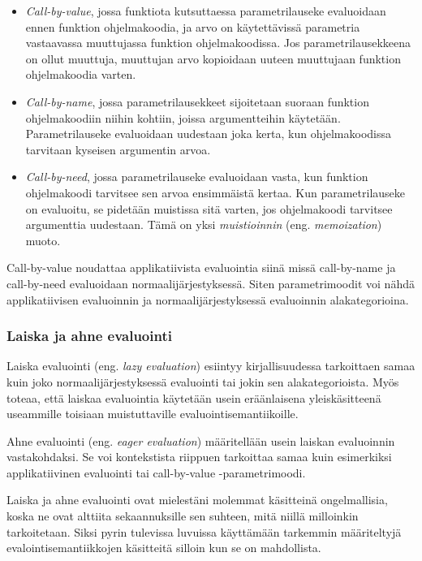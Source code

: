 \begin{itemize}
	\item \textit{Call-by-value}, jossa funktiota kutsuttaessa parametrilauseke evaluoidaan ennen funktion ohjelmakoodia, ja arvo on käytettävissä parametria vastaavassa muuttujassa funktion ohjelmakoodissa. Jos parametrilausekkeena on ollut muuttuja, muuttujan arvo kopioidaan uuteen muuttujaan funktion ohjelmakoodia varten. \citep{scott2009programming}
    \item \textit{Call-by-name}, jossa parametrilausekkeet sijoitetaan suoraan funktion ohjelmakoodiin niihin kohtiin, joissa argumentteihin käytetään. Parametrilauseke evaluoidaan uudestaan joka kerta, kun ohjelmakoodissa tarvitaan kyseisen argumentin arvoa. \citep{ariola1995callbyneed}
    \item \textit{Call-by-need}, jossa parametrilauseke evaluoidaan vasta, kun funktion ohjelmakoodi tarvitsee sen arvoa ensimmäistä kertaa. Kun parametrilauseke on evaluoitu, se pidetään muistissa sitä varten, jos ohjelmakoodi tarvitsee argumenttia uudestaan. Tämä on yksi \textit{muistioinnin} (eng. \textit{memoization}) muoto. \citep{ariola1995callbyneed}
\end{itemize}

Call-by-value noudattaa applikatiivista evaluointia siinä missä call-by-name ja call-by-need evaluoidaan normaalijärjestyksessä. Siten parametrimoodit voi nähdä applikatiivisen evaluoinnin ja normaalijärjestyksessä evaluoinnin alakategorioina.

\subsubsection{Laiska ja ahne evaluointi}

Laiska evaluointi (eng. \textit{lazy evaluation}) esiintyy kirjallisuudessa tarkoittaen samaa kuin joko normaalijärjestyksessä evaluointi tai jokin sen alakategorioista. Myös \citet{scott2009programming} toteaa, että laiskaa evaluointia käytetään usein eräänlaisena yleiskäsitteenä useammille toisiaan muistuttaville evaluointisemantiikoille.

Ahne evaluointi (eng. \textit{eager evaluation}) määritellään usein laiskan evaluoinnin vastakohdaksi. Se voi kontekstista riippuen tarkoittaa samaa kuin esimerkiksi applikatiivinen evaluointi tai call-by-value -parametrimoodi.

Laiska ja ahne evaluointi ovat mielestäni molemmat käsitteinä ongelmallisia, koska ne ovat alttiita sekaannuksille sen suhteen, mitä niillä milloinkin tarkoitetaan. Siksi pyrin tulevissa luvuissa käyttämään tarkemmin määriteltyjä evalointisemantiikkojen käsitteitä silloin kun se on mahdollista.